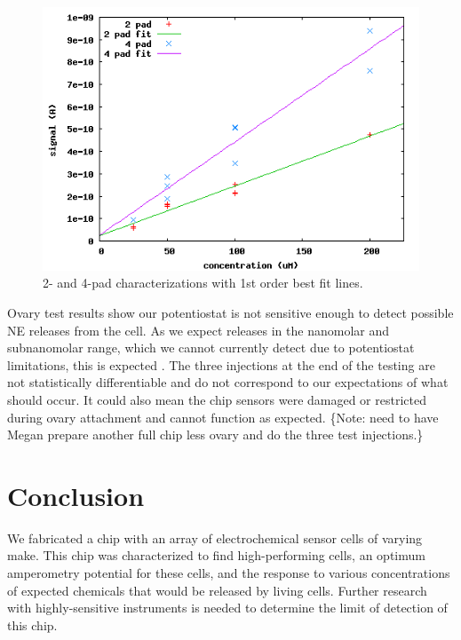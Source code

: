 \documentclass[twocolumn]{article}
\begin{document}
\begin{figure}
\centering
\includegraphics[width=\linewidth]{figures/char.png}
\caption{2- and 4-pad characterizations with 1st order best fit lines.}
\label{char}
\end{figure}

Ovary test results show our potentiostat is not sensitive enough to detect possible NE releases from the cell. As we expect releases in the nanomolar and subnanomolar range, which we cannot currently detect due to potentiostat limitations, this is expected \cite{amperometry-review}. The three injections at the end of the testing are not statistically differentiable and do not correspond to our expectations of what should occur. It could also mean the chip sensors were damaged or restricted during ovary attachment and cannot function as expected. \{Note: need to have Megan prepare another full chip less ovary and do the three test injections.\}

\section{Conclusion}

We fabricated a chip with an array of electrochemical sensor cells of varying make. This chip was characterized to find high-performing cells, an optimum amperometry potential for these cells, and the response to various concentrations of expected chemicals that would be released by living cells. Further research with highly-sensitive instruments is needed to determine the limit of detection of this chip.
\end{document}
